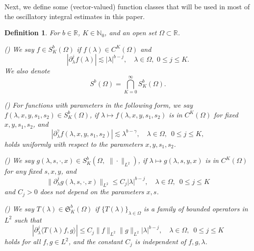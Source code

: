 \documentclass[11pt,reqno]{amsart}
\newtheorem{definition}[theorem]{Definition}
\numberwithin{equation}{section}
\theoremstyle{definition}
\begin{document}
Next, we define some (vector-valued) function classes that will be used in most of the oscillatory integral estimates in this paper.
\begin{definition}
For $b\in\mathbb{R}$,  $K\in\mathbb{N}_0$, and an open set $\Omega\subset\mathbb{R}$.

\noindent\emph{()} We say $f\in S_K^b(\Omega)$ if $f(\lambda)\in C^K(\Omega)$ and
\begin{equation}\label{eq1}
|\partial_\lambda^j f(\lambda)|\lesssim|\lambda|^{b-j},\quad\lambda\in\Omega,\,\,0\leq j\leq K.
\end{equation}
We also denote
 \begin{equation}\label{eq-Skb-infit}
 S^b(\Omega)=\bigcap_{K=0}^\infty S_K^b(\Omega).
 \end{equation}

\noindent\emph{()}
For functions with parameters in the following form, we say
$f\left(\lambda, x, y, s_{1}, s_{2}\right)\in  S_{K}^{b}(\Omega)$, if $\lambda\mapsto f\left(\lambda, x, y, s_{1}, s_{2}\right)$ is in $C^K(\Omega)$ for fixed $x, y, s_{1}, s_{2}$, and
\begin{equation}\label{eq-Skb-2}
  |\partial_{\lambda}^{\gamma} f\left(\lambda, x, y, s_{1}, s_{2}\right)|\lesssim\lambda^{b-\gamma},\quad\lambda\in\Omega,\,\,\,0\leq j\leq K,
\end{equation}
holds uniformly with respect to the parameters  $x, y, s_{1}, s_{2}$.

\noindent\emph{()}
We say $g(\lambda, s,\cdot, x)\in S_K^b(\Omega,\,\, \|\cdot \|_{L^{2}})$, if
$\lambda\mapsto g(\lambda, s, y, x)$ is in $C^{K}(\Omega)$ for any fixed $s, x, y$, and
   \begin{equation}\label{eq1.111}
\|\partial_{\lambda}^j g(\lambda, s,\cdot, x)\|_{L^{2}}\leq C_j|\lambda|^{b-j},\quad\lambda\in\Omega,\,\,\,0\leq j\leq K
   \end{equation}
and $C_j>0$  does not depend on the parameters  $x, s$.

\noindent\emph{()}
We say $T(\lambda)\in \mathfrak{S}_K^b(\Omega)$ if $\{T(\lambda)\}_{\lambda\in\Omega}$ is a family of bounded operators in $L^2$ such that
\begin{equation}\label{eq2}
|\partial_\lambda^j \langle T(\lambda)f, g\rangle|\leq C_j\|f\|_{L^2}\|g\|_{L^2}|\lambda|^{b-j},\quad\lambda\in\Omega,\,\,\,0\leq j\leq K
\end{equation}
holds for all $f, g\in L^2$, and the constant $C_j$ is independent of $f, g, \lambda$.
\end{definition}
\end{document}

